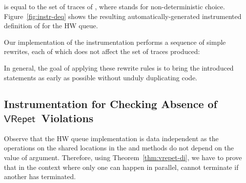\documentclass{LMCS}
\newcommand{\VRepet}{\ensuremath{\mathsf{VRepet}}}
\begin{document}
is equal to the set of traces of , where  stands for
non-deterministic choice.
Figure~\ref{fig:instr-deq} shows the resulting automatically-generated 
instrumented definition of  for the HW queue.

Our implementation of the instrumentation performs a sequence of simple rewrites,
each of which does not affect the set of traces produced:

In general, the goal of applying these rewrite rules is to bring the introduced
 statements as early as possible without unduly duplicating
code.

\subsection*{Instrumentation for Checking Absence of \VRepet\ Violations}

Observe that the HW queue implementation is data independent as the operations 
on the shared locations in the  and  methods do not depend
on the value of argument. 
Therefore, using Theorem~\ref{thm:vrepet-di}, we have to prove that in the
context where only one  can happen in parallel,  cannot
terminate if another  has terminated.
\end{document}
